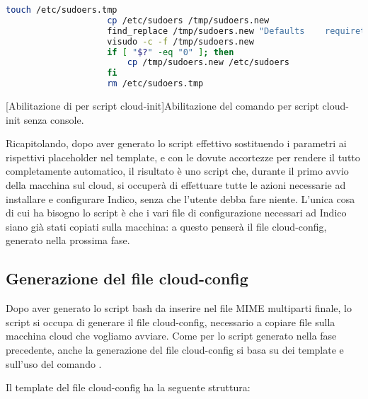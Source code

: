             \begin{center}
                \begin{lstlisting}[language=bash, gobble=18]
                    touch /etc/sudoers.tmp
                    cp /etc/sudoers /tmp/sudoers.new
                    find_replace /tmp/sudoers.new "Defaults    requiretty" "Defaults    !requiretty"
                    visudo -c -f /tmp/sudoers.new
                    if [ "$?" -eq "0" ]; then
                        cp /tmp/sudoers.new /etc/sudoers
                    fi
                    rm /etc/sudoers.tmp
                \end{lstlisting}
                \captionsetup{textformat=empty,labelformat=empty} \vspace{-2em}
                [Abilitazione di  per script cloud-init]{Abilitazione del comando  per script cloud-init senza console.}
            \end{center}
            
            Ricapitolando, dopo aver generato lo script effettivo sostituendo i parametri ai rispettivi placeholder nel template, e con le dovute accortezze per rendere il tutto completamente automatico, il risultato è uno script che, durante il primo avvio della macchina sul cloud, si occuperà di effettuare tutte le azioni necessarie ad installare e configurare Indico, senza che l'utente debba fare niente. L'unica cosa di cui ha bisogno lo script è che i vari file di configurazione necessari ad Indico siano già stati copiati sulla macchina: a questo penserà il file cloud-config, generato nella prossima fase.
        
        \subsection{Generazione del file cloud-config} \label{subsec:cd;dci;generazione_cloud-config}
        
            Dopo aver generato lo script bash da inserire nel file \ac{MIME} multiparti finale, lo script  si occupa di generare il file cloud-config, necessario a copiare file sulla macchina cloud che vogliamo avviare. Come per lo script generato nella fase precedente, anche la generazione del file cloud-config si basa su dei template e sull'uso del comando .
            
            Il template del file cloud-config ha la seguente struttura:
            
